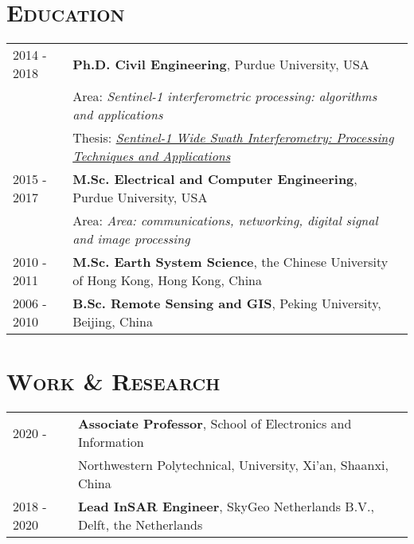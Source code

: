 \documentclass[letterpaper]{article}
\begin{document}
\section*{\textsc{Education}}
\begin{tabular}{ll}
2014 - 2018 & \textbf{Ph.D. Civil Engineering}, Purdue University, USA\\
		& Area: \textit{Sentinel-1 interferometric processing: algorithms and applications} \\
		& Thesis: \href{https://doi.org/10.25394/PGS.7543214.v1}{\textit{Sentinel-1 Wide Swath Interferometry: Processing Techniques and Applications}} \vspace{.5em}\\
2015 - 2017 & \textbf{M.Sc. Electrical and Computer Engineering}, Purdue University, USA\\
		& Area: \textit{Area: communications, networking, digital signal and image processing} \vspace{.5em}\\

2010 - 2011 & \textbf{M.Sc. Earth System Science}, the Chinese University of Hong Kong, Hong Kong, China \vspace{.5em}\\
        
2006 - 2010 & \textbf{B.Sc. Remote Sensing and GIS}, Peking University, Beijing, China\\
\end{tabular}


\section*{\textsc{Work \& Research}}
\begin{tabular}{ll}
2020 -      & \textbf{Associate Professor}, School of Electronics and Information \\ & Northwestern Polytechnical, University, Xi'an, Shaanxi, China  \vspace{.5em}\\
2018 - 2020 & \textbf{Lead InSAR Engineer}, SkyGeo Netherlands B.V.,  Delft, the Netherlands \\
\end{tabular}
\end{document}
